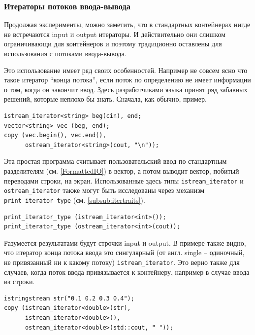 \documentclass[a4paper,12pt,oneside]{article}
\newif\ifanswers
\begin{document}
\ifanswers
Разумеется random access. Догадаться можно по наличию у деки оператора квадратные скобки.
\fi

\subsubsection{Итераторы потоков ввода-вывода}\label{subsub:streamiter}

Продолжая эксперименты, можно заметить, что в стандартных контейнерах нигде не встречаются input и output итераторы. И действительно они слишком ограничивающи для контейнеров и поэтому традиционно оставлены для использования с потоками ввода-вывода.

Это использование имеет ряд своих особенностей. Например не совсем ясно что такое итератор ``конца потока'', если поток по определению не имеет информации о том, когда он закончит ввод. Здесь разработчиками языка принят ряд забавных решений, которые неплохо бы знать. Сначала, как обычно, пример.

\begin{lstlisting}
istream_iterator<string> beg(cin), end;
vector<string> vec (beg, end);
copy (vec.begin(), vec.end(), 
      ostream_iterator<string>(cout, "\n"));
\end{lstlisting}

Эта простая программа считывает пользовательский ввод по стандартным разделителям (см. \ref{FormattedIO}) в вектор, а потом выводит вектор, побитый переводами строки, на экран. Использованные здесь типы \lstinline!istream_iterator! и \lstinline!ostream_iterator! также могут быть исследованы через механизм \lstinline!print_iterator_type! (см. \ref{subsub:itertraits}).

\begin{lstlisting}
print_iterator_type (istream_iterator<int>()); 
print_iterator_type (ostream_iterator<int>(cout));
\end{lstlisting}

Разумеется результатами будут строчки input и output. В примере также видно, что итератор конца потока ввода это сингулярный (от англ. single -- одиночный, не привязанный ни к какому потоку) \lstinline!istream_iterator!. Это верно также для случаев, когда поток ввода привязывается к контейнеру, например в случае ввода из строки.

\begin{lstlisting}
istringstream str("0.1 0.2 0.3 0.4");
copy (istream_iterator<double>(str),
      istream_iterator<double>(),
      ostream_iterator<double>(std::cout, " "));
\end{lstlisting}
\end{document}
